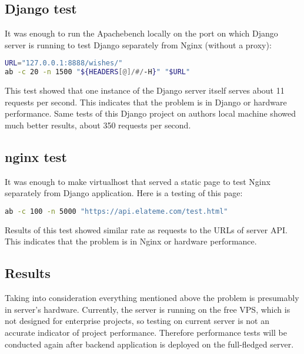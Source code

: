 \subsection{Django test}
It was enough to run the Apachebench locally on the port on which Django server is running to test Django separately from Nginx (without a proxy):

\begin{lstlisting}[language=bash]
URL="127.0.0.1:8888/wishes/"
ab -c 20 -n 1500 "${HEADERS[@]/#/-H}" "$URL"
\end{lstlisting}

This test showed that one instance of the Django server itself serves about 11 requests per second. This indicates that the problem is in Django or hardware performance. Same tests of this Django project on authors local machine showed much better results, about 350 requests per second.


\subsection{nginx test}
It was enough to make virtualhost that served a static page to test Nginx separately from Django application. Here is a testing of this page:

\begin{lstlisting}[language=bash]
ab -c 100 -n 5000 "https://api.elateme.com/test.html"
\end{lstlisting}

Results of this test showed similar rate as requests to the \ac{URL}s of server \ac{API}. This indicates that the problem is in Nginx or hardware performance.


\subsection{Results}
Taking into consideration everything mentioned above the problem is presumably in server's hardware. Currently, the server is running on the free \ac{VPS}, which is not designed for enterprise projects, so testing on current server is not an accurate indicator of project performance. Therefore performance tests will be conducted again after backend application is deployed on the full-fledged server.


